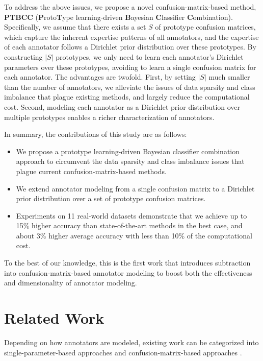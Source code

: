 \documentclass[letterpaper]{article} %
\begin{document}
To address the above issues, we propose a novel confusion-matrix-based method, \textbf{PTBCC} (\textbf{P}roto\textbf{T}ype learning-driven \textbf{B}ayesian \textbf{C}lassifier \textbf{C}ombination). Specifically, we assume that there exists a set $S$ of prototype confusion matrices, which capture the inherent expertise patterns of all annotators, and the expertise of each annotator follows a Dirichlet prior distribution over these prototypes. By constructing $|S|$ prototypes, we only need to learn each annotator's Dirichlet parameters over these prototypes, avoiding to learn a single confusion matrix for each annotator. The advantages are twofold. First, by setting $|S|$ much smaller than the number of annotators, we alleviate the issues of data sparsity and class imbalance that plague existing methods, and largely reduce the computational cost. Second, modeling each annotator as a Dirichlet prior distribution over multiple prototypes enables a richer characterization of annotators.

In summary, the contributions of this study are as follows:
\begin{itemize}
    \item We propose a prototype learning-driven Bayesian classifier combination approach to circumvent the data sparsity and class imbalance issues that plague current confusion-matrix-based methods.
    \item We extend annotator modeling from a single confusion matrix to a Dirichlet prior distribution over a set of prototype confusion matrices.
    \item Experiments on 11 real-world datasets demonstrate that we achieve up to 15\% higher accuracy than state-of-the-art methods in the best case, and about 3\% higher average accuracy with less than 10\% of the computational cost.
\end{itemize}

\noindent
To the best of our knowledge, this is the first work that introduces subtraction into confusion-matrix-based annotator modeling to boost both the effectiveness and dimensionality of annotator modeling.
\section{Related Work}
Depending on how annotators are modeled, existing work can be categorized into single-parameter-based approaches \cite{Demartinietal2012,Bonald17,Lietal2019b,Caoetal2020} and confusion-matrix-based approaches \cite{KimGhahramani2012,Lietal2019a,Songetal2021,Zhangetal24,Chenetal25}.
\end{document}

